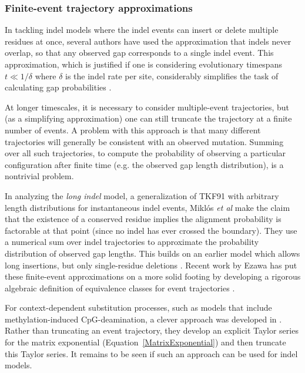 \documentclass{bmcart}
\newcommand{\eqref}[1]{Equation~\ref{#1}}
\begin{document}
\subsubsection*{Finite-event trajectory approximations}

In tackling indel models where the indel events can insert or delete multiple residues at once,
several authors have used the approximation that indels never overlap,
so that any observed gap corresponds to a single indel event.
This approximation, which is justified if one is considering evolutionary timespans $t \ll 1/\delta$
where $\delta$ is the indel rate per site,
considerably simplifies the task of calculating gap probabilities
\cite{KnudsenMiyamoto2003,RedelingsSuchard2005,SuchardRedelings2006,RedelingsSuchard2007,WestessonEtAlArxiv2011,WestessonEtAl2012,WestessonBarquistHolmes2012}.

At longer timescales, it is necessary to consider multiple-event trajectories,
but (as a simplifying approximation) one can still truncate the trajectory at a finite number of events.
A problem with this approach is that many different trajectories will generally be consistent with an observed mutation.
Summing over all such trajectories, to compute the probability of observing a particular configuration after finite time
(e.g. the observed gap length distribution),
is a nontrivial problem.

In analyzing the {\em long indel} model,
a generalization of TKF91 with arbitrary length distributions for instantaneous indel events,
Mikl\'{o}s {\em et al} \cite{MiklosLunterHolmes2004}
make the claim that the existence of a conserved residue implies the alignment probability is factorable at that point
 (since no indel has ever crossed the boundary).
They use a numerical sum over indel trajectories to approximate the probability distribution of observed gap lengths.
This builds on an earlier model which allows long insertions, but only single-residue deletions \cite{MiklosEtal2001}.
Recent work by Ezawa has put these finite-event approximations on a more solid footing
by developing a rigorous algebraic definition of equivalence classes for event trajectories \cite{Ezawa2016a,Ezawa2016b,Ezawa2016bErratum}.

For context-dependent substitution processes,
such as models that include methylation-induced CpG-deamination,
a clever approach was developed in \cite{LunterHein04}.
Rather than truncating an event trajectory, they develop an explicit Taylor series for the matrix exponential
(\eqref{MatrixExponential}) and then truncate this Taylor series.
It remains to be seen if such an approach can be used for indel models.
\end{document}
